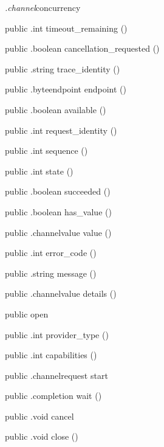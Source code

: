 \begin{CrexxClass}{\textit{.channel}}{concurrency}
\begin{Members}
    \Method
      {public}
      {.int}
      {timeout\_remaining}
      {()}

    \Method
      {public}
      {.boolean}
      {cancellation\_requested}
      {()}

    \Method
      {public}
      {.string}
      {trace\_identity}
      {()}

    \Method
      {public}
      {.byteendpoint}
      {endpoint}
      {()}

    \Method
      {public}
      {.boolean}
      {available}
      {()}

    \Method
      {public}
      {.int}
      {request\_identity}
      {()}

    \Method
      {public}
      {.int}
      {sequence}
      {()}

    \Method
      {public}
      {.int}
      {state}
      {()}

    \Method
      {public}
      {.boolean}
      {succeeded}
      {()}

    \Method
      {public}
      {.boolean}
      {has\_value}
      {()}

    \Method
      {public}
      {.channelvalue}
      {value}
      {()}

    \Method
      {public}
      {.int}
      {error\_code}
      {()}

    \Method
      {public}
      {.string}
      {message}
      {()}

    \Method
      {public}
      {.channelvalue}
      {details}
      {()}

    \Factory
      {public}
      {open}
      {}

    \Method
      {public}
      {.int}
      {provider\_type}
      {()}

    \Method
      {public}
      {.int}
      {capabilities}
      {()}

    \Method
      {public}
      {.channelrequest}
      {start}
      {}

    \Method
      {public}
      {.completion}
      {wait}
      {()}

    \Method
      {public}
      {.void}
      {cancel}
      {}

    \Method
      {public}
      {.void}
      {close}
      {()}

  \end{Members}
\end{CrexxClass}

